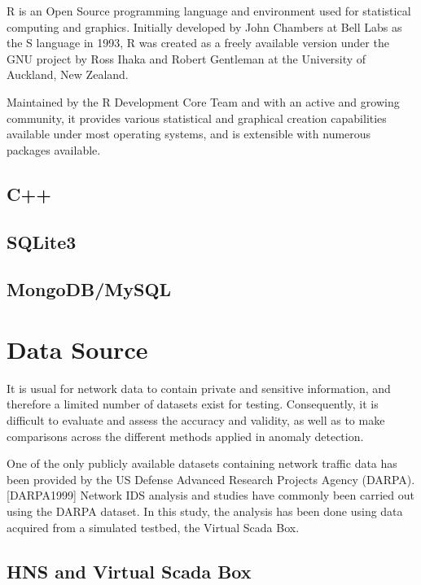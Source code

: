 \documentclass[12pt,]{article}
\begin{document}
R is an Open Source programming language and environment used for
statistical computing and graphics. Initially developed by John Chambers
at Bell Labs as the S language in 1993, R was created as a freely
available version under the GNU project by Ross Ihaka and Robert
Gentleman at the University of Auckland, New Zealand.

Maintained by the R Development Core Team and with an active and growing
community, it provides various statistical and graphical creation
capabilities available under most operating systems, and is extensible
with numerous packages available.

\subsection{C++}\label{c}

\subsection{SQLite3}\label{sqlite3}

\subsection{MongoDB/MySQL}\label{mongodbmysql}

\pagebreak

\section{Data Source}\label{data-source}

It is usual for network data to contain private and sensitive
information, and therefore a limited number of datasets exist for
testing. Consequently, it is difficult to evaluate and assess the
accuracy and validity, as well as to make comparisons across the
different methods applied in anomaly detection.

One of the only publicly available datasets containing network traffic
data has been provided by the US Defense Advanced Research Projects
Agency (DARPA). {[}DARPA1999{]} Network IDS analysis and studies have
commonly been carried out using the DARPA dataset. In this study, the
analysis has been done using data acquired from a simulated testbed, the
Virtual Scada Box.

\subsection{HNS and Virtual Scada Box}\label{hns-and-virtual-scada-box}
\end{document}

